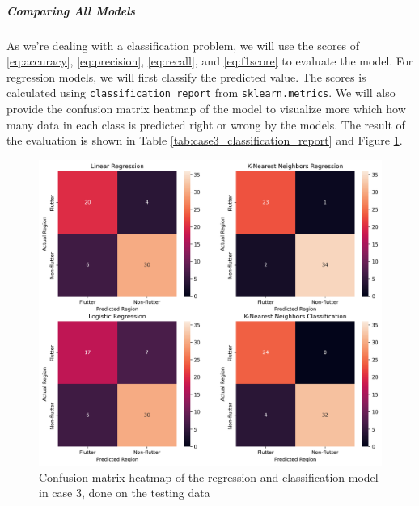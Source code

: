 \documentclass[conf]{new-aiaa}
\begin{document}
\subparagraph{Comparing All Models} As we're dealing with a classification problem, we will use the scores of \eqref{eq:accuracy}, \eqref{eq:precision}, \eqref{eq:recall}, and \eqref{eq:f1score} to evaluate the model. For regression models, we will first classify the predicted value. The scores is calculated using \texttt{classification\_report} from \texttt{sklearn.metrics}. We will also provide the confusion matrix heatmap of the model to visualize more which how many data in each class is predicted right or wrong by the models. The result of the evaluation is shown in Table \ref{tab:case3_classification_report} and Figure \ref{fig:case3_confusion}. 
\begin{figure}[H]
    \centering
    \includegraphics[width=1.0\textwidth]{graph/case3_confusion.png}
    \caption{Confusion matrix heatmap of the regression and classification model in case 3, done on the testing data}
    \label{fig:case3_confusion}
\end{figure}
\end{document}
